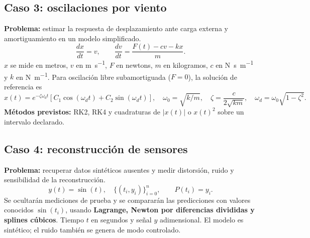 \documentclass[letterpaper,11pt]{article}
\begin{document}
\subsection{Caso 3: oscilaciones por viento}
\textbf{Problema:} estimar la respuesta de desplazamiento ante carga externa y amortiguamiento en un modelo simplificado.
\begin{equation}\label{eq:oscilacion}
\frac{dx}{dt}=v,\qquad \frac{dv}{dt}=\frac{F(t)-cv-kx}{m}.
\end{equation}
$x$ se mide en metros, $v$ en \si{\meter\per\second}, $F$ en newtons, $m$ en kilogramos, $c$ en \si{\newton\second\per\meter} y $k$ en \si{\newton\per\meter}. Para oscilación libre subamortiguada ($F=0$), la solución de referencia es
\begin{equation}\label{eq:vibracion}
x(t)=e^{-\zeta\omega_0 t}[C_1\cos(\omega_dt)+C_2\sin(\omega_dt)],\quad
\omega_0=\sqrt{k/m},\quad \zeta=\frac{c}{2\sqrt{km}},\quad\omega_d=\omega_0\sqrt{1-\zeta^2}.
\end{equation}
\textbf{Métodos previstos:} RK2, RK4 y cuadraturas de $|x(t)|$ o $x(t)^2$ sobre un intervalo declarado.

\subsection{Caso 4: reconstrucción de sensores}
\textbf{Problema:} recuperar datos sintéticos ausentes y medir distorsión, ruido y sensibilidad de la reconstrucción.
\begin{equation}\label{eq:sensores}
y(t)=\sin(t),\quad \{(t_i,y_i)\}_{i=0}^n,\qquad P(t_i)=y_i.
\end{equation}
Se ocultarán mediciones de prueba y se compararán las predicciones con valores conocidos $\sin(t_i)$, usando \textbf{Lagrange, Newton por diferencias divididas y splines cúbicos}. Tiempo $t$ en segundos y señal $y$ adimensional. El modelo es sintético; el ruido también se genera de modo controlado.
\end{document}
